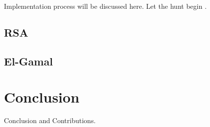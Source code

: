 \documentclass[12pt,journal,compsoc]{IEEEtran}
\begin{document}
Implementation process will be discussed here. Let the hunt begin \cite{ref:Elgamal1985}.

\subsection{RSA}

\subsection{El-Gamal}


\section{Conclusion}
Conclusion and Contributions.




%
%



%
%
\end{document}
